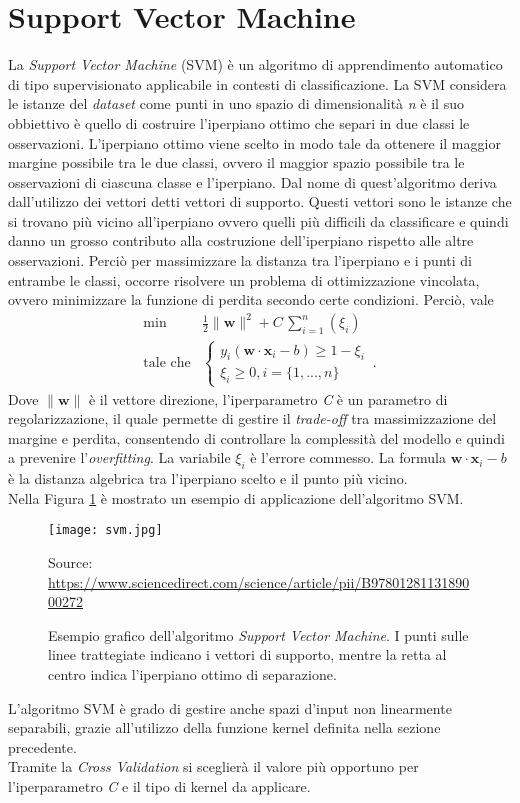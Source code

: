\section{Support Vector Machine}
La \emph{Support Vector Machine} (SVM) \autocite{GHOLAMI2017515} è un algoritmo di apprendimento automatico di tipo supervisionato applicabile in contesti di classificazione. La SVM considera le istanze del \emph{dataset} come punti in uno spazio di dimensionalità \emph{n} è il suo obbiettivo è quello di costruire l'iperpiano ottimo che separi in due classi le osservazioni. L'iperpiano ottimo viene scelto in modo tale da ottenere il maggior margine possibile tra le due classi, ovvero il maggior spazio possibile tra le osservazioni di ciascuna classe e l'iperpiano. Dal nome di quest'algoritmo deriva dall'utilizzo dei vettori detti vettori di supporto. Questi vettori sono le istanze che si trovano più vicino all'iperpiano ovvero quelli più difficili da classificare e quindi danno un grosso contributo alla costruzione dell'iperpiano rispetto alle altre osservazioni. Perciò per massimizzare la distanza tra l'iperpiano e i punti di entrambe le classi, occorre risolvere un problema di ottimizzazione vincolata, ovvero minimizzare la funzione di perdita secondo certe condizioni. Perciò, vale 
\begin{align*}
	\text{min} & \frac{1}{2} \|\mathbf{w}\|^2 + C \, \sum_{i=1}^{n} (\xi_i) \\
	\text{tale che} & 
	\begin{cases}
		y_i(\mathbf{w \cdot x}_i - b) \geq  1 - \xi_i \\
		\xi_i \geq 0, i=\{1,...,n\}
	\end{cases} \, .
\end{align*}
Dove $\|\mathbf{w}\|$ è il vettore direzione, l'iperparametro \emph{C} è un parametro di regolarizzazione, il quale permette di gestire il \emph{trade-off} tra massimizzazione del margine e perdita, consentendo di controllare la complessità del modello e quindi a prevenire l'\emph{overfitting}. La variabile $\xi_i$ è l'errore commesso. La formula $\mathbf{w \cdot x}_i - b$ è la distanza algebrica tra l'iperpiano scelto e il punto più vicino.\\
Nella Figura \ref{fig:svm} è mostrato un esempio di applicazione dell'algoritmo SVM.\\
\begin{figure}[h]
	\begin{center}
		\texttt{[image: svm.jpg]}
		\caption{Esempio grafico dell'algoritmo \emph{Support Vector Machine}. I punti sulle linee trattegiate indicano i vettori di supporto, mentre la retta al centro indica l'iperpiano ottimo di separazione.
		} 
		Source: \url{https://www.sciencedirect.com/science/article/pii/B9780128113189000272}\label{fig:svm}
	\end{center}
\end{figure}
L'algoritmo SVM è grado di gestire anche spazi d'input non linearmente separabili, grazie all'utilizzo della funzione kernel definita nella sezione precedente.\\
Tramite la \emph{Cross Validation} si sceglierà il valore più opportuno per l'iperparametro \emph{C} e il tipo di kernel da applicare.

